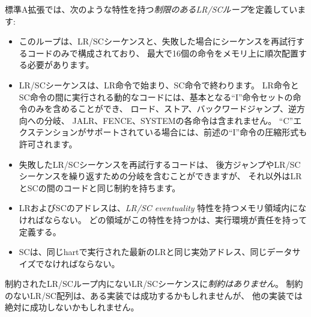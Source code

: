標準A拡張では、次のような特性を持つ{\em 制限のあるLR/SCループ}を定義しています:
\vspace{-0.2in}
\begin{itemize}
\parskip 0pt
\itemsep 1pt
\item このループは、LR/SCシーケンスと、失敗した場合にシーケンスを再試行するコードのみで構成されており、
最大で16個の命令をメモリ上に順次配置する必要があります。
\item LR/SCシーケンスは、LR命令で始まり、SC命令で終わります。
LR命令とSC命令の間に実行される動的なコードには、基本となる``I''命令セットの命令のみを含めることができ、
ロード、ストア、バックワードジャンプ、逆方向への分岐、
JALR、FENCE、SYSTEMの各命令は含まれません。
``C''エクステンションがサポートされている場合には、前述の``I''命令の圧縮形式も許可されます。
\item 失敗したLR/SCシーケンスを再試行するコードは、
後方ジャンプやLR/SCシーケンスを繰り返すための分岐を含むことができますが、
それ以外はLRとSCの間のコードと同じ制約を持ちます。
\item LRおよびSCのアドレスは、{\em LR/SC eventuality} 特性を持つメモリ領域内になければならない。
どの領域がこの特性を持つかは、実行環境が責任を持って定義する。
\item SCは、同じhartで実行された最新のLRと同じ実効アドレス、同じデータサイズでなければならない。
\end{itemize}

\begin{comment}
LR/SC sequences that do not lie within constrained LR/SC loops are {\em
unconstrained}.  Unconstrained LR/SC sequences might succeed on some attempts
on some implementations, but might never succeed on other implementations.
\end{comment}

制約されたLR/SCループ内にないLR/SCシーケンスに{\em 制約はありません}。
制約のないLR/SC配列は、ある実装では成功するかもしれませんが、
他の実装では絶対に成功しないかもしれません。

